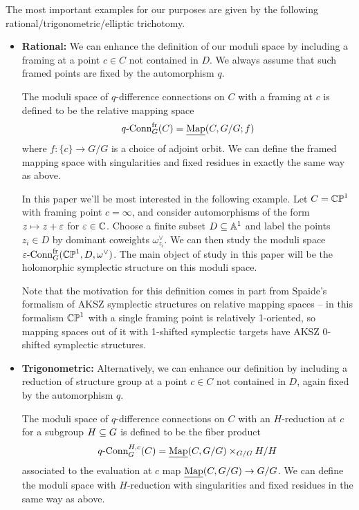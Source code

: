 \documentclass[10pt, oneside]{article}
\newcommand{\map}{\ul{\mr{Map}}}
\newcommand{\qconn}{q\text{-Conn}}
\newcommand{\epsconn}{\varepsilon\text{-Conn}}
\newcommand{\fr}{\mathrm{fr}}
\begin{document}
\begin{examples}
The most important examples for our purposes are given by the following rational/trigonometric/elliptic trichotomy.
 \begin{itemize}
  \item \textbf{Rational:} We can enhance the definition of our moduli space by including a framing at a point $c \in C$ not contained in $D$.  We always assume that such framed points are fixed by the automorphism $q$.
  \begin{definition}
    The moduli space of $q$-difference connections on $C$ with a framing at $c$ is defined to be the relative mapping space 
    \[\qconn_G^\fr(C) = \map(C, G/G; f)\]
    where $f \colon \{c\} \to G/G$ is a choice of adjoint orbit.  We can define the framed mapping space with singularities and fixed residues in exactly the same way as above.  
  \end{definition}
    
    In this paper we'll be most interested in the following example.  Let $C = \mathbb{CP}^1$ with framing point $c = \infty$, and consider automorphisms of the form $z \mapsto z + \varepsilon$ for $\varepsilon \in \mathbb{C}$.  Choose a finite subset $D \subseteq \mathbb{A}^1$ and label the points $z_i \in D$ by dominant coweights $\omega^\vee_{z_i}$.  We can then study the moduli space $\epsconn^\fr_G(\bb{CP}^1,D, \omega^\vee)$.  The main object of study in this paper will be the holomorphic symplectic structure on this moduli space.  
    
    Note that the motivation for this definition comes in part from Spaide's formalism \cite{Spaide} of AKSZ symplectic structures on relative mapping spaces -- in this formalism $\mathbb{CP}^1$ with a single framing point is relatively 1-oriented, so mapping spaces out of it with 1-shifted symplectic targets have AKSZ 0-shifted symplectic structures.
  
  \item \textbf{Trigonometric:} Alternatively, we can enhance our definition by including a reduction of structure group at a point $c \in C$ not contained in $D$, again fixed by the automorphism $q$.
  \begin{definition}
   The moduli space of $q$-difference connections on $C$ with an $H$-reduction at $c$ for a subgroup $H \subseteq G$ is defined to be the fiber product
   \[\qconn_G^{H,c}(C) = \map(C,G/G) \times_{G/G} H/H\]
   associated to the evaluation at $c$ map $\map(C,G/G) \to G/G$.  We can define the moduli space with $H$-reduction with singularities and fixed residues in the same way as above.
  \end{definition}
  

\end{itemize}
\end{examples}
\end{document}
